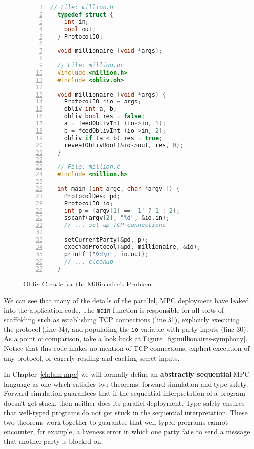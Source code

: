 \documentclass{report}
\begin{document}
\begin{figure}[h]
\begin{lstlisting}[language=c,basicstyle=\footnotesize\ttfamily,numbers=left,stepnumber=1]
  // File: million.h
  typedef struct {
    int in;
    bool out;
  } ProtocolIO;

  void millionaire (void *args);

  // File: million.oc
  #include <million.h>
  #include <obliv.oh>

  void millionaire (void *args) {
    ProtocolIO *io = args;
    obliv int a, b;
    obliv bool res = false;
    a = feedOblivInt (io->in, 1);
    b = feedOblivInt (io->in, 2);
    obliv if (a < b) res = true;
    revealOblivBool(&io->out, res, 0);
  }

  // File: million.c
  #include <million.h>

  int main (int argc, char *argv[]) {
    ProtocolDesc pd;
    ProtocolIO io;
    int p = (argv[1] == '1' ? 1 : 2);
    sscanf(argv[2], "%d", &io.in);
    // ... set up TCP connections

    setCurrentParty(&pd, p);
    execYaoProtocol(&pd, millionaire, &io);
    printf ("%d\n", io.out);
    // ... cleanup
  }
\end{lstlisting}
\caption{Obliv-C code for the Millionaire's Problem}
\label{fig:millionaires-oblivc}
\end{figure}

We can see that many of the details of the parallel, MPC deployment have leaked into the application code. The
\lstinline[language=c,basicstyle=\ttfamily]{main} function is responsible for all sorts of scaffolding such as establishing TCP connections (line 31),
explicitly executing the protocol (line 34), and populating the \lstinline[language=c,basicstyle=\ttfamily]{io} variable with party inputs (line 30). As
a point of comparison, take a look back at Figure~\ref{fig:millionaires-symphony}. Notice that this code makes no mention of TCP connections,
explicit execution of any protocol, or eagerly reading and caching secret inputs.

In Chapter~\ref{ch:lam-mpc} we will formally define an \textbf{abstractly sequential} MPC language as one which satisfies two theorems:
forward simulation and type safety. Forward simulation guarantees that if the sequential interpretation of a program doesn't get stuck,
then neither does its parallel deployment. Type safety ensures that well-typed programs do not get stuck in the sequential interpretation.
These two theorems work together to guarantee that well-typed programs cannot encounter, for example, a liveness error in which one party
fails to send a message that another party is blocked on.
\end{document}
